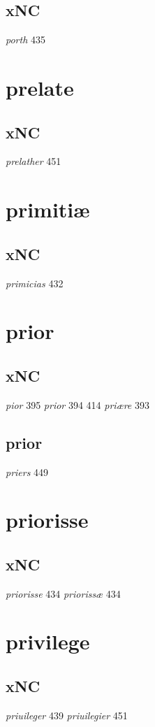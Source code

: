 \documentclass[a4paper,twocolumn]{article}
\begin{document}
\subsection{xNC}
\label{sec:org30e38f0}
\emph{porth} 435 
\section{prelate}
\label{sec:org3a67d86}
\subsection{xNC}
\label{sec:orga540ebe}
\emph{prelather} 451 
\section{primitiæ}
\label{sec:orge99f22d}
\subsection{xNC}
\label{sec:org324b656}
\emph{primicias} 432 
\section{prior}
\label{sec:orgc3229b9}
\subsection{xNC}
\label{sec:orga165ea1}
\emph{pior} 395 \emph{prior} 394 414 \emph{priære} 393 
\subsection{prior}
\label{sec:org0baa3b9}
\emph{priers} 449 
\section{priorisse}
\label{sec:org3044021}
\subsection{xNC}
\label{sec:org45ef419}
\emph{priorisse} 434 \emph{priorissæ} 434 
\section{privilege}
\label{sec:org87254c3}
\subsection{xNC}
\label{sec:orgf36fa27}
\emph{priuileger} 439 \emph{priuilegier} 451 
\end{document}
